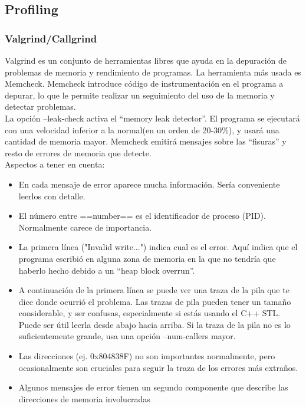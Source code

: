 \documentclass{article}
\begin{document}
\subsection{Profiling}
\subsubsection{Valgrind/Callgrind}
Valgrind es un conjunto de herramientas libres que ayuda en la depuración de problemas de memoria y rendimiento de programas. La herramienta más usada es Memcheck. Memcheck introduce código de instrumentación en el programa a depurar, lo que le permite realizar un seguimiento del uso de la memoria y detectar problemas. \\

La opción –leak-check activa el “memory leak detector”. El programa se ejecutará con una velocidad inferior a la normal(en un orden de 20-30\%), y usará una cantidad de memoria mayor. Memcheck emitirá mensajes sobre las “fisuras” y resto de errores de memoria que detecte.\\

Aspectos a tener en cuenta:
\begin{itemize}
\item En cada mensaje de error aparece mucha información. Sería conveniente leerlos con detalle.
\item El número entre ==number== es el identificador de proceso (PID). Normalmente carece de importancia.
\item La primera línea ("Invalid write...") indica cual es el error. Aquí indica que el programa escribió en alguna zona de memoria en la que no tendría que haberlo hecho debido a un “heap block overrun”.
\item A continuación de la primera línea se puede ver una traza de la pila que te dice donde ocurrió el problema. Las trazas de pila pueden tener un tamaño considerable, y ser confusas, especialmente si estás usando el C++ STL. Puede ser útil leerla desde abajo hacia arriba. Si la traza de la pila no es lo suficientemente grande, usa una opción –num-callers mayor.
\item Las direcciones (ej. 0x804838F) no son importantes normalmente, pero ocasionalmente son cruciales para seguir la traza de los errores más extraños.
\item Algunos mensajes de error tienen un segundo componente que describe las direcciones de memoria involucradas
\end{itemize}
\end{document}
